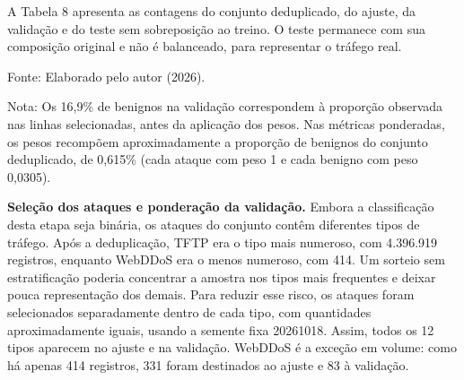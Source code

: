 \documentclass[
    12pt,                %
    openright,           %
    oneside,             %
    a4paper,             %
    english,             %
    brazil               %
]{abntex2}
\begin{document}
A Tabela 8 apresenta as contagens do conjunto deduplicado, do ajuste, da validação e do teste sem sobreposição ao treino. O teste permanece com sua composição original e não é balanceado, para representar o tráfego real.

\begin{table}
\centering
\caption{Registros por classe após a deduplicação e nos conjuntos do balanceamento binário}
\label{tab:registros-balanceamento-binario}
\par\smallskip
Fonte: Elaborado pelo autor (2026).

\begin{minipage}{\textwidth}
\footnotesize
Nota: Os 16,9\% de benignos na validação correspondem à proporção observada nas linhas selecionadas, antes da aplicação dos pesos. Nas métricas ponderadas, os pesos recompõem aproximadamente a proporção de benignos do conjunto deduplicado, de 0,615\% (cada ataque com peso 1 e cada benigno com peso 0,0305).
\end{minipage}
\end{table}

\textbf{Seleção dos ataques e ponderação da validação.} Embora a classificação desta etapa seja binária, os ataques do conjunto contêm diferentes tipos de tráfego. Após a deduplicação, TFTP era o tipo mais numeroso, com 4.396.919 registros, enquanto WebDDoS era o menos numeroso, com 414. Um sorteio sem estratificação poderia concentrar a amostra nos tipos mais frequentes e deixar pouca representação dos demais. Para reduzir esse risco, os ataques foram selecionados separadamente dentro de cada tipo, com quantidades aproximadamente iguais, usando a semente fixa 20261018. Assim, todos os 12 tipos aparecem no ajuste e na validação. WebDDoS é a exceção em volume: como há apenas 414 registros, 331 foram destinados ao ajuste e 83 à validação.
\end{document}
